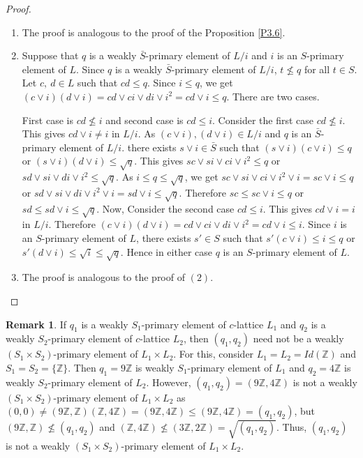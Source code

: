 \documentclass[10pt,twoside,a4paper]{amsart}
\numberwithin{equation}{section}
\theoremstyle{plain}
\theoremstyle{definition}
\newtheorem{rem}[lem]{Remark}
\begin{document}
\begin{proof}
	\begin{enumerate}
		\item The proof is analogous to the proof of the Proposition \ref{P3.6}.
		
		\item Suppose that  $q$ is a weakly $\bar{S}$-primary element of $L/i$ and $i$ is an $S$-primary element of $L$. Since $q$ is a weakly $\bar{S}$-primary element of $L/i$, $t \nleq q$ for all $t \in S$.  Let $c,~d \in L$ such that $cd \leq q$. Since $i \leq q$, we get $(c \vee i ) (d \vee i) = cd \vee ci \vee di \vee i^2  = cd \vee i \leq q$. There are two cases. 
		
		First case is $cd \nleq i$ and second case is $cd \leq i$. Consider the first case $cd \nleq i$. This gives $cd \vee i \neq i$ in $L/i$.  As $(c \vee i), (d \vee i) \in L/i$ and $q$ is an $\bar{S}$-primary element of $L/i$.  there exists $s \vee i \in \bar{S}$ such that $(s \vee i) (c \vee i) \leq q$ or $(s \vee i) (d \vee i) \leq \sqrt{q}$. This gives $sc \vee si \vee ci \vee i^2 \leq q$ or $sd \vee si \vee di \vee i^2 \leq \sqrt{q}$. As $i \leq q \leq \sqrt{q}$, we get $ sc \vee si \vee ci \vee i^2 \vee i = sc \vee i  \leq q$ or $ sd \vee si \vee di \vee i^2 \vee i  = sd \vee i \leq \sqrt{q} $. Therefore $sc \leq sc \vee i \leq q $ or $sd \leq sd \vee i \leq \sqrt{q}$. Now, Consider the  second case $cd \leq i$. This gives $cd \vee i = i$ in $L/i$. Therefore $(c \vee i ) (d \vee i) = cd \vee ci \vee di \vee i^2  = cd \vee i \leq i$. Since $i$ is an $S$-primary element of $L$, there exists $s' \in S$ such that $s' (c \vee i) \leq i \leq q$ or $ s' (d \vee i) \leq \sqrt{i} \leq \sqrt{q}$. Hence in either case $q$ is an $S$-primary element of $L$.
		
		\item The proof is analogous to the proof of $(2)$.  
\end{enumerate}\end{proof}





\begin{rem}%
	If $q_1$ is a weakly $S_1$-primary element of $c$-lattice $L_1$ and $q_2$ is a weakly $S_2$-primary element of $c$-lattice $L_2$, then $(q_1,q_2)$ need not be a weakly $(S_1\times S_2)$-primary element of $L_1\times L_2$. For this, consider $L_1=L_2=Id(\mathbb{Z})$ and $S_1=S_2=\{\mathbb{Z}\}$. Then $q_1=9\mathbb{Z}$ is weakly $S_1$-primary element of $L_1$ and $q_2=4\mathbb{Z}$ is weakly $S_2$-primary element of $L_2$. However, $(q_1,q_2)=(9\mathbb{Z},4\mathbb{Z})$ is not a weakly $(S_1\times S_2)$-primary element of $L_1\times L_2$ as $(0,0)\neq (9\mathbb{Z},\mathbb{Z})(\mathbb{Z},4\mathbb{Z})=(9\mathbb{Z},4\mathbb{Z})\leq (9\mathbb{Z},4\mathbb{Z})=(q_1,q_2)$, but $(9\mathbb{Z},\mathbb{Z})\nleq (q_1,q_2)$ and $(\mathbb{Z},4\mathbb{Z})\nleq (3\mathbb{Z},2\mathbb{Z})=\sqrt{(q_1,q_2)}$. Thus, $(q_1,q_2)$ is not a weakly $(S_1\times S_2)$-primary element of $L_1\times L_2$.
\end{rem}
\end{document}
